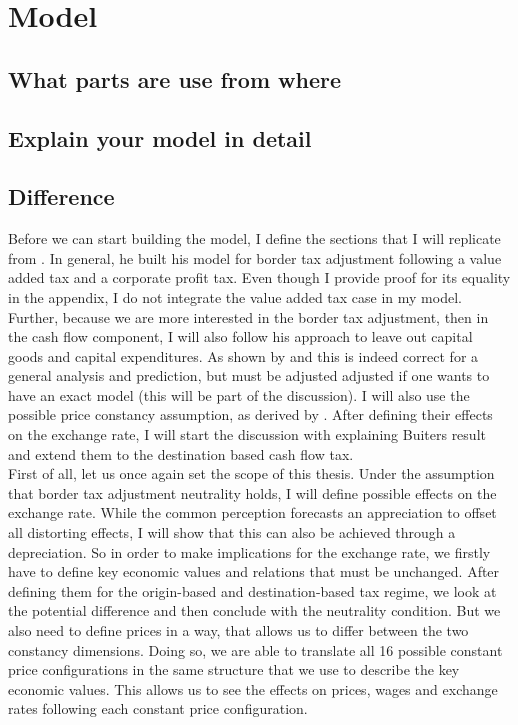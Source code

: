 \section{Model}
\subsection{What parts are use from where}
\subsection{Explain your model in detail}

\subsection{Difference }

Before we can start building the model, I define the sections that I will replicate from \cite{buiter2017exchange}. In general, he built his model for border tax adjustment following a value added tax and a corporate profit tax. Even though I provide proof for its equality in the appendix, I do not integrate the value added tax case in my model. 
Further, because we are more interested in the border tax adjustment, then in the cash flow component, I will also follow his approach to leave out capital goods and capital expenditures. As shown by \cite{barbiero2018macroeconomics} and \cite{gopinath2017macroeconomic} this is indeed correct for a general analysis and prediction, but must be adjusted adjusted if one wants to have an exact model (this will be part of the discussion). I will also use the possible price constancy assumption, as derived by \cite{buiter2017exchange}. After defining their effects on the exchange rate, I will start the discussion with explaining Buiters result and extend them to the destination based cash flow tax. \\
First of all, let us once again set the scope of this thesis. Under the assumption that border tax adjustment neutrality holds, I will define possible effects on the exchange rate.   While the common perception forecasts an appreciation to offset all distorting effects, I will show that this can also be achieved through a depreciation. So in order to make implications for the exchange rate, we firstly have to define key economic values and relations that must be unchanged. After defining them for the origin-based and destination-based tax regime, we look at the potential difference and then conclude with the neutrality condition. 
But we also need to define prices in a way, that allows us to differ between the two constancy dimensions. Doing so, we are able to translate all 16 possible constant price configurations in the same structure that we use to describe the key economic values. This allows us to see the effects on prices, wages and exchange rates following each constant price configuration.\\

